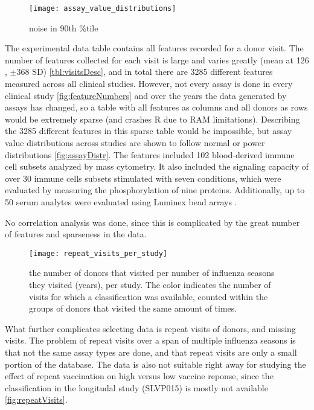 \begin{figure}[htpb]
    \texttt{[image: assay\_value\_distributions]}
    \caption{noise in 90th \%tile}\label{fig:assayDistr}
\end{figure}

The experimental data table contains all features recorded for a donor visit.
The number of features collected for each visit is large and varies greatly
(mean at 126 , \(\pm \)368 SD) \autoref{tbl:visitsDesc}, and in total there are
3285 different features measured across all clinical studies. However, not
every assay is done in every clinical study \autoref{fig:featureNumbers} and
over the years the data generated by assays has changed, so a table with all
features as columns and all donors as rows would be extremely sparse (and
crashes R due to RAM limitations).  Describing the 3285 different features in
this sparse table would be impossible, but assay value distributions across
studies are shown to follow normal or power distributions
\autoref{fig:assayDistr}. The features included 102 blood-derived immune cell
subsets analyzed by mass cytometry. It also included the signaling capacity of
over 30 immune cells subsets stimulated with seven conditions, which were
evaluated by measuring the phosphorylation of nine proteins. Additionally, up
to 50 serum analytes were evaluated using Luminex bead arrays
\citep{tomicSIMONAutomatedMachine2019}.

No correlation analysis was done, since this is complicated by the great number
of features and sparseness in the data.

\begin{figure}[htpb]
    \texttt{[image: repeat\_visits\_per\_study]}
    \caption{the number of donors that visited per number of influenza seasons
    they visited (years), per study. The color indicates the number of visits for which a
    classification was available, counted within the groups of donors that
    visited the same amount of times.}\label{fig:repeatVisits}
\end{figure}

What further complicates selecting data is repeat visits of donors, and missing
visits. The problem of repeat visits over a span of multiple influenza seasons
is that not the same assay types are done, and that repeat visits are only a
small portion of the database. The data is also not suitable right away for
studying the effect of repeat vaccination on high versus low vaccine reponse,
since the classification in the longitudal study (SLVP015) is mostly not
available \autoref{fig:repeatVisits}.

